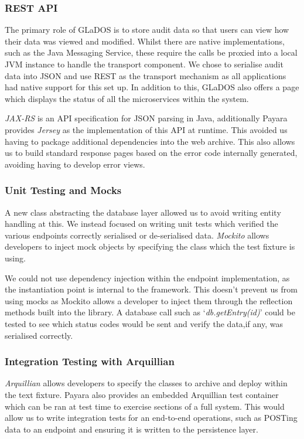 \subsubsection{REST API}
\par
The primary role of GLaDOS is to store audit data so that users can view how their data was viewed and modified. Whilst there are native implementations, such as the Java Messaging Service, these require the calls be proxied into a local JVM instance to handle the transport component. We chose to serialise audit data into JSON and use REST as the transport mechanism as all applications had native support for this set up. In addition to this, GLaDOS also offers a page which displays the status of all the microservices within the system.

\par
\textit{JAX-RS} is an API specification for JSON parsing in Java, additionally Payara provides \textit{Jersey} as the implementation of this API at runtime. This avoided us having to package additional dependencies into the web archive. This also allows us to build standard response pages based on the error code internally generated, avoiding having to develop error views.        

\subsubsection{Unit Testing and Mocks}
\par
A new class abstracting the database layer allowed us to avoid writing entity handling at this. We instead focused on writing unit tests which verified the various endpoints correctly serialised or de-serialised data. \textit{Mockito}\cite{Mockito} allows developers to inject mock objects by specifying the class which the test fixture is using.

\par
We could not use dependency injection within the endpoint implementation, as the instantiation point is internal to the framework. This doesn't prevent us from using mocks as Mockito allows a developer to inject them through the reflection methods built into the library. A database call such as `\textit{db.getEntry(id)}' could be tested to see which status codes would be sent and verify the data,if any, was serialised correctly.

\subsubsection{Integration Testing with Arquillian}
\textit{Arquillian}\cite{Arquillian} allows developers to specify the classes to archive and deploy within the text fixture. Payara also provides an embedded Arquillian test container which can be ran at test time to exercise sections of a full system. This would allow us to write integration tests for an end-to-end operations, such as POSTing data to an endpoint and ensuring it is written to the persistence layer.

